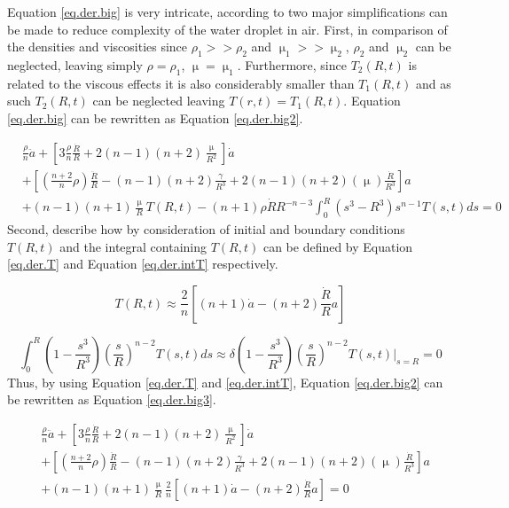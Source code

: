 \noindent Equation \ref{eq.der.big} is very intricate, according to \citet{Zeng2018} two major simplifications can be made to reduce complexity of the water droplet in air. First, in comparison of the densities and viscosities since $\rho_1 >> \rho_2$ and  $\upmu_1 >> \upmu_2$, $\rho_2$ and $\upmu_2$  can be neglected, leaving simply $\rho = \rho_1$,  $\upmu= \upmu_1$. Furthermore, since $T_2(R,t)$ is related to the viscous effects it is also considerably smaller than $T_1(R,t)$ and as such $T_2(R,t)$ can be neglected leaving $T(r,t) = T_1(R,t)$. Equation \ref{eq.der.big} can be rewritten as Equation \ref{eq.der.big2}.

\begin{equation} \label{eq.der.big2}
\begin{split}
& \frac{\rho}{n}  \ddot{a} + \left[3 \frac{\rho}{n} \frac{\dot{R}}{R} + 2(n-1)(n+2) \frac{\upmu}{R^2} \right]\dot{a}  \\ & +\left[ \left(  \frac{n+2}{n}\rho \right)\frac{\ddot{R}}{R} - (n-1)(n+2)\frac{\gamma}{R^3} + 2(n-1)(n+2)( \upmu)\frac{\dot{R}}{R^3}  \right] a  \\& + (n-1)(n+1)\frac{\upmu}{R} T(R,t)   - (n+1)\rho\dot{R}R^{-n-3} \int_0^R (s^3-R^3)s^{n-1}T(s,t)ds  = 0 
\end{split}
\end{equation}
\noindent Second, \citet{Zeng2018} describe how by consideration of initial and boundary conditions $T(R,t)$ and the integral containing $T(R,t)$ can be defined by Equation \ref{eq.der.T} and Equation \ref{eq.der.intT} respectively.

\begin{equation}\label{eq.der.T}
	T(R,t) \approx \frac{2}{n}\left[(n+1)\dot{a} - (n+2)\frac{\dot{R}}{R} a\right]
\end{equation} 

\begin{equation}\label{eq.der.intT}
	\int_0^R \left(1 - \frac{s^3}{R^3}\right)\left(\frac{s}{R}\right)^{n-2} T(s,t)ds \approx \delta \left( 1 - \frac{s^3}{R^3}  \right) \left(\frac{s}{R}\right)^{n-2} T(s,t)\big\rvert_{s=R} = 0
\end{equation}
\noindent Thus, by using Equation \ref{eq.der.T} and \ref{eq.der.intT}, Equation \ref{eq.der.big2} can be rewritten as Equation \ref{eq.der.big3}.

\begin{equation} \label{eq.der.big3}
\begin{split}
& \frac{\rho}{n}  \ddot{a} + \left[3 \frac{\rho}{n} \frac{\dot{R}}{R} + 2(n-1)(n+2) \frac{\upmu}{R^2} \right]\dot{a}  \\ & +\left[ \left(  \frac{n+2}{n}\rho \right)\frac{\ddot{R}}{R} - (n-1)(n+2)\frac{\gamma}{R^3} + 2(n-1)(n+2)( \upmu)\frac{\dot{R}}{R^3}  \right] a  \\& + (n-1)(n+1)\frac{\upmu}{R} \frac{2}{n}\left[(n+1)\dot{a} - (n+2)\frac{\dot{R}}{R} a\right]   = 0 
\end{split}
\end{equation}

